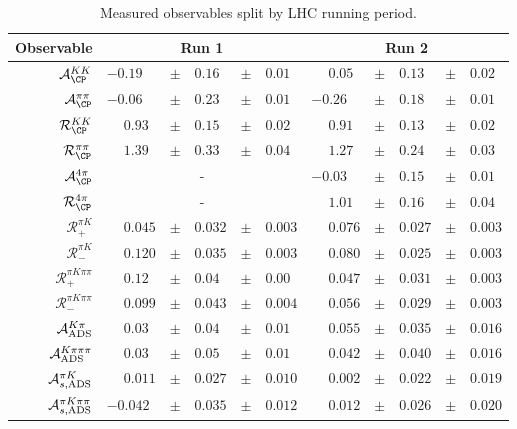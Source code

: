 \begin{table}
\centering
\caption{Measured observables split by LHC running period.}
\begin{tabular}{rlclcllclcl}
Observable & \multicolumn{5}{c}{Run 1} & \multicolumn{5}{c}{Run 2}\\
\midrule
$\mathcal{A}_{\CP}^{KK}$ & $-0.19$ & $\pm$ & $0.16$ & $\pm$ & $0.01$ & $\phantom{+}0.05$ & $\pm$ & $0.13$ & $\pm$ & $0.02$ \\
$\mathcal{A}_{\CP}^{\pi\pi}$ & $-0.06$ & $\pm$ & $0.23$ & $\pm$ & $0.01$ & $-0.26$ & $\pm$ & $0.18$ & $\pm$ & $0.01$ \\
$\mathcal{R}_{\CP}^{KK}$ & $\phantom{+}0.93$ & $\pm$ & $0.15$ & $\pm$ & $0.02$ & $\phantom{+}0.91$ & $\pm$ & $0.13$ & $\pm$ & $0.02$ \\
$\mathcal{R}_{\CP}^{\pi\pi}$ & $\phantom{+}1.39$ & $\pm$ & $0.33$ & $\pm$ & $0.04$ & $\phantom{+}1.27$ & $\pm$ & $0.24$ & $\pm$ & $0.03$ \\
$\mathcal{A}_{\CP}^{4\pi}$ & \multicolumn{5}{c}{\--} & $-0.03$ & $\pm$ & $0.15$ & $\pm$ & $0.01$ \\
$\mathcal{R}_{\CP}^{4\pi}$ & \multicolumn{5}{c}{\--} & $\phantom{+}1.01$ & $\pm$ & $0.16$ & $\pm$ & $0.04$ \\
$\mathcal{R}_+^{\pi K}$ & $\phantom{+}0.045$ & $\pm$ & $0.032$ & $\pm$ & $0.003$ & $\phantom{+}0.076$ & $\pm$ & $0.027$ & $\pm$ & $0.003$ \\
$\mathcal{R}_-^{\pi K}$ & $\phantom{+}0.120$ & $\pm$ & $0.035$ & $\pm$ & $0.003$ & $\phantom{+}0.080$ & $\pm$ & $0.025$ & $\pm$ & $0.003$ \\
$\mathcal{R}_+^{\pi K\pi\pi}$ & $\phantom{+}0.12$ & $\pm$ & $0.04$ & $\pm$ & $0.00$ & $\phantom{+}0.047$ & $\pm$ & $0.031$ & $\pm$ & $0.003$ \\
$\mathcal{R}_-^{\pi K\pi\pi}$ & $\phantom{+}0.099$ & $\pm$ & $0.043$ & $\pm$ & $0.004$ & $\phantom{+}0.056$ & $\pm$ & $0.029$ & $\pm$ & $0.003$ \\
$\mathcal{A}_{\rm ADS}^{K\pi}$ & $\phantom{+}0.03$ & $\pm$ & $0.04$ & $\pm$ & $0.01$ & $\phantom{+}0.055$ & $\pm$ & $0.035$ & $\pm$ & $0.016$ \\
$\mathcal{A}_{\rm ADS}^{K\pi\pi\pi}$ & $\phantom{+}0.03$ & $\pm$ & $0.05$ & $\pm$ & $0.01$ & $\phantom{+}0.042$ & $\pm$ & $0.040$ & $\pm$ & $0.016$ \\
$\mathcal{A}_{s,\rm ADS}^{\pi K}$ & $\phantom{+}0.011$ & $\pm$ & $0.027$ & $\pm$ & $0.010$ & $\phantom{+}0.002$ & $\pm$ & $0.022$ & $\pm$ & $0.019$ \\
$\mathcal{A}_{s,\rm ADS}^{\pi K\pi\pi}$ & $-0.042$ & $\pm$ & $0.035$ & $\pm$ & $0.012$ & $\phantom{+}0.012$ & $\pm$ & $0.026$ & $\pm$ & $0.020$ \\

\end{tabular}
\end{table}
